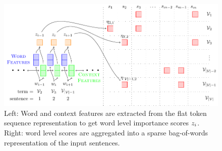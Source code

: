 \begin{figure}
 \begin{center}
  \includegraphics[scale=.7]{chapter4/figures/4_2_wimp_model.pdf}
 \end{center}
\caption{Left: Word and context features are extracted from the flat token
sequence representation to get word level importance scores 
$z_i$. Right: word level scores are aggregated into a sparse
bag-of-words representation of the input sentences.}
\end{figure}
